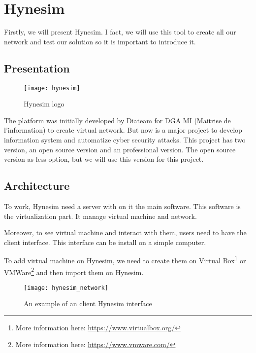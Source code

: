 
\chapter{Hynesim}
\label{chap:hynesim}

Firstly, we will present Hynesim. I fact, we will use this tool to create all our network and test our solution so
it is important to introduce it.

\section{Presentation}

\begin{figure}[h]
  \centering
  \texttt{[image: hynesim]}
  \caption{Hynesim logo}
  \label{fig:hynesim}
\end{figure}



The platform was initially developed by Diateam for DGA MI (Maitrise de l'information) to create virtual network.
But now is a major project to develop information system and automatize cyber security attacks. This project has
two version, an open source version and an professional version. The open source version as less option, but we
will use this version for this project.

\section{Architecture}

To work, Hynesim need a server with on it the main software. This software is the virtualization part. It manage
virtual machine and network.

Moreover, to see virtual machine and interact with them, users need to have the client interface. This interface
can be install on a simple computer.

To add virtual machine on Hynesim, we need to create them on Virtual Box\footnote{More information here:
  \url{https://www.virtualbox.org/}} or VMWare\footnote{More information here: \url{https://www.vmware.com/}} and
then import them on Hynesim.

\begin{figure}[h]
  \centering
  \texttt{[image: hynesim\_network]}
  \caption{An example of an client Hynesim interface}
\end{figure}





